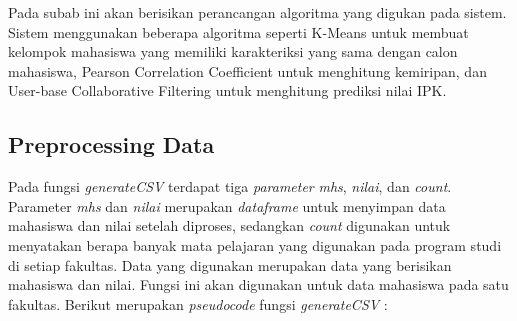 Pada subab ini akan berisikan perancangan algoritma yang digukan pada sistem. Sistem menggunakan beberapa algoritma seperti K-Means untuk membuat kelompok mahasiswa yang memiliki karakteriksi yang sama dengan calon mahasiswa, Pearson Correlation Coefficient untuk menghitung kemiripan, dan User-base Collaborative Filtering untuk menghitung prediksi nilai IPK.

\subsection{Preprocessing Data}
\label{subsec:perancangan preprocessing data}

Pada fungsi \textit{generateCSV} terdapat tiga \textit{parameter} \textit{mhs}, \textit{nilai}, dan \textit{count}. Parameter \textit{mhs} dan \textit{nilai} merupakan \textit{dataframe} untuk menyimpan data mahasiswa dan nilai setelah diproses, sedangkan \textit{count} digunakan untuk menyatakan berapa banyak mata pelajaran yang digunakan pada program studi di setiap fakultas. Data yang digunakan merupakan data yang berisikan mahasiswa dan nilai. Fungsi ini akan digunakan untuk data mahasiswa pada satu fakultas. Berikut merupakan \textit{pseudocode} fungsi \textit{generateCSV} : 

